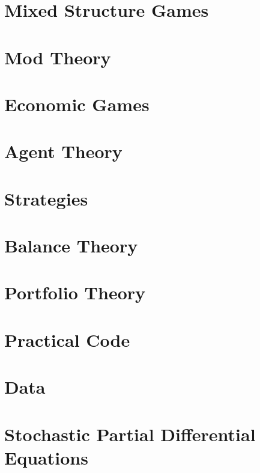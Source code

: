 \documentclass[]{article}
\theoremstyle{definition}
\theoremstyle{definition}
\begin{document}
	\section{Mixed Structure Games}
	\section{Mod Theory}
	
	\section{Economic Games}
	\section{Agent Theory}
	\section{Strategies}
	\section{Balance Theory}
	\section{Portfolio Theory}
	\section{Practical Code}
	\section{Data}
	\section{Stochastic Partial Differential Equations}
	
	
	
	
	
	
	
\end{document}
